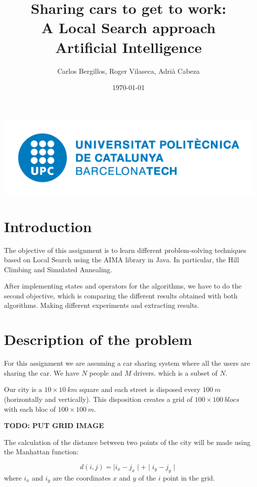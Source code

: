 \documentclass[12]{article}
\author{Carlos Bergillos, Roger Vilaseca, Adrià Cabeza}
\title{\textbf{Sharing cars to get to work:\\ A Local Search approach}\\ \bigskip Artificial Intelligence}
\date{\today}
\begin{document}
\maketitle
\vspace*{\fill}
\begin{center}
\includegraphics[scale=0.5]{images/UPClogo.png}
\end{center}

\newpage
\tableofcontents
\newpage
\section{Introduction}

The objective of this assignment is to learn different problem-solving techniques based on Local Search using the AIMA library in Java.
In particular, the Hill Climbing and Simulated Annealing.

After implementing states and operators for the algorithms, we have to do the second objective, which is comparing the different results obtained with both algorithms.
Making different experiments and extracting results.

\section{Description of the problem}

For this assignment we are assuming a car sharing system where all the users are sharing the car. We have $N$ people and $M$ drivers. which is a subset of $N$. 

Our city is a $10\times10\ km$ square and each street is disposed every $100\ m$ (horizontally and vertically). This disposition creates a grid of $100\times100\ blocs$ with each bloc of $100\times100\ m$.

\textbf{TODO: PUT GRID IMAGE}

The calculation of the distance between two points of the city will be made using the Manhattan function: 

$$ d(i,j) = \mid i_x - j_x\mid+ \mid i_y - j_y\mid $$
where $i_x$ and $i_y$ are the coordinates $x$ and $y$ of the $i$ point in the grid. 
\end{document}
